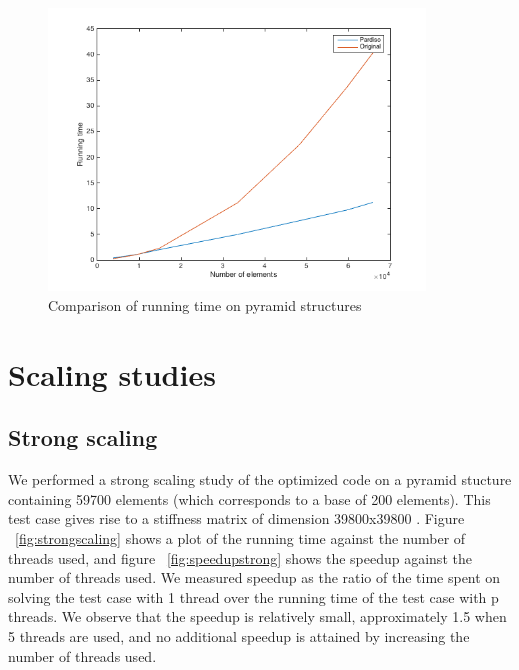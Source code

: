 \documentclass[11pt]{article}
\begin{document}
\begin{figure}[H]
\begin{center}

\includegraphics[width=10cm]{pyrplot}
\caption{Comparison of running time on pyramid structures}
\label{fig:pyr_comp}
\end{center}
\end{figure}


\section{Scaling studies}\label{sec:scaling}


\subsection{Strong scaling}


We performed a strong scaling study of the optimized code on a pyramid stucture containing 59700 elements (which corresponds to a base of 200 elements). This test case gives rise to a stiffness matrix of dimension 39800x39800 .  Figure ~\ref{fig:strongscaling} shows a plot of the running time against the number of threads used, and figure ~\ref{fig:speedupstrong} shows the speedup against the number of threads used. We measured speedup as the ratio of the time spent on solving the test case with 1 thread over the running time of the test case with p threads. We observe that the speedup is relatively small, approximately 1.5 when 5 threads are used, and no additional speedup is attained by increasing the number of threads used.
\end{document}
